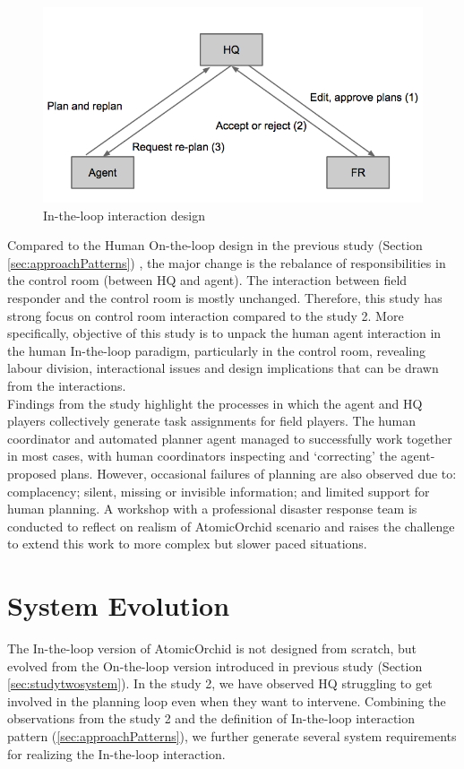 \begin{figure}[h]
  \centering
  \includegraphics[width=1\textwidth]{img/study3/InTheLoop}
  \caption{In-the-loop interaction design}
  \label{fig:study2InTheLoop}
\end{figure}

Compared to the Human On-the-loop design in the previous study (Section \ref{sec:approachPatterns}) , the major change is the rebalance of responsibilities in the control room (between HQ and agent). The interaction between field responder and the control room is mostly unchanged. Therefore, this study has strong focus on control room interaction compared to the study 2. More specifically, objective of this study is to unpack the human agent interaction in the human In-the-loop paradigm, particularly in the control room, revealing labour division, interactional issues and design implications that can be drawn from the interactions.\\

Findings from the study highlight the processes in which the agent and HQ players collectively generate task assignments for field players. The human coordinator and automated planner agent managed to successfully work together in most cases, with human coordinators inspecting and `correcting' the agent-proposed plans. However, occasional failures of planning are also observed due to: complacency; silent, missing or invisible information; and limited support for human planning. A workshop with a professional disaster response team is conducted to reflect on realism of AtomicOrchid scenario and raises the challenge to extend this work to more complex but slower paced situations. \\


\section{System Evolution}\label{sec:study3system}
The In-the-loop version of AtomicOrchid is not designed from scratch, but evolved from the On-the-loop version introduced in previous study (Section \ref{sec:studytwosystem}). In the study 2, we have observed HQ struggling to get involved in the planning loop even when they want to intervene. Combining the observations from the study 2 and the definition of In-the-loop interaction pattern (\ref{sec:approachPatterns}), we further generate several system requirements for realizing the In-the-loop interaction. \\

